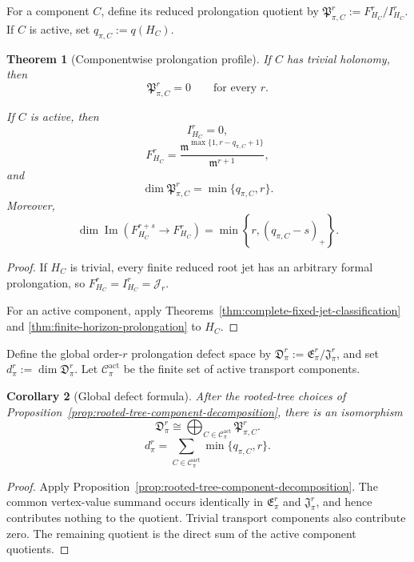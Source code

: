 \documentclass[11pt]{article}
\theoremstyle{plain}
\newtheorem{theorem}{Theorem}[section]
\newtheorem{corollary}[theorem]{Corollary}
\theoremstyle{definition}
\begin{document}
For a component \(C\), define its reduced prolongation quotient by
\(\mathfrak P_{\pi,C}^r := F_{H_C}^r/I_{H_C}^r\).
If \(C\) is active, set
\(q_{\pi,C}:=q(H_C)\).

\begin{theorem}[Componentwise prolongation profile]
\label{thm:componentwise-prolongation-profile}
If \(C\) has trivial holonomy, then
\[
  \mathfrak P_{\pi,C}^r=0
  \qquad
  \text{for every }r.
\]

If \(C\) is active, then
\[
  I_{H_C}^r=0,
\]
\[
  F_{H_C}^r
  =
  \frac{
    \mathfrak m^{
      \max\{1,r-q_{\pi,C}+1\}
    }
  }{
    \mathfrak m^{r+1}
  },
\]
and
\[
  \boxed{
  \dim\mathfrak P_{\pi,C}^r
  =
  \min\{q_{\pi,C},r\}.
  }
\]
Moreover,
\[
  \dim
  \operatorname{Im}
  \left(
    F_{H_C}^{r+s}
    \longrightarrow
    F_{H_C}^r
  \right)
  =
  \min
  \left\{
    r,
    (q_{\pi,C}-s)_+
  \right\}.
\]
\end{theorem}

\begin{proof}
If \(H_C\) is trivial, every finite reduced root jet has an arbitrary
formal prolongation, so
\(F_{H_C}^r=I_{H_C}^r=\mathcal J_r\).

For an active component, apply
Theorems~\ref{thm:complete-fixed-jet-classification}
and \ref{thm:finite-horizon-prolongation}
to \(H_C\).
\end{proof}

Define the global order-\(r\) prolongation defect space by
\(\mathfrak D_\pi^r := \mathfrak E_\pi^r/ \mathfrak J_\pi^r\),
and set
\(d_\pi^r := \dim\mathfrak D_\pi^r\).
Let \(\mathscr C_\pi^{\mathrm{act}}\) be the finite set of active transport components.

\begin{corollary}[Global defect formula]
\label{cor:global-defect-formula}
After the rooted-tree choices of
Proposition~\ref{prop:rooted-tree-component-decomposition},
there is an isomorphism
\[
  \boxed{
  \mathfrak D_\pi^r
  \cong
  \bigoplus_{
    C\in\mathscr C_\pi^{\mathrm{act}}
  }
  \mathfrak P_{\pi,C}^r.
  }
\]
\[
  \boxed{
  d_\pi^r
  =
  \sum_{
    C\in\mathscr C_\pi^{\mathrm{act}}
  }
  \min\{q_{\pi,C},r\}.
  }
\]
\end{corollary}

\begin{proof}
Apply
Proposition~\ref{prop:rooted-tree-component-decomposition}.
The common vertex-value summand occurs identically in
\(\mathfrak E_\pi^r\) and \(\mathfrak J_\pi^r\), and hence contributes
nothing to the quotient. Trivial transport components also contribute
zero. The remaining quotient is the direct sum of the active
component quotients.
\end{proof}
\end{document}

